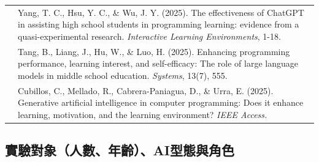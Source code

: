 \begin{longtable}{@{}p{} p{}@{}}
\cite{yang2025chatgpt} & Yang, T. C., Hsu, Y. C., \& Wu, J. Y. (2025). The effectiveness of ChatGPT in assisting high school students in programming learning: evidence from a quasi-experimental research. \textit{Interactive Learning Environments}, 1-18. \\
\cite{tang2025enhancing} & Tang, B., Liang, J., Hu, W., \& Luo, H. (2025). Enhancing programming performance, learning interest, and self-efficacy: The role of large language models in middle school education. \textit{Systems}, 13(7), 555. \\
\cite{cubillos2025generative} & Cubillos, C., Mellado, R., Cabrera-Paniagua, D., \& Urra, E. (2025). Generative artificial intelligence in computer programming: Does it enhance learning, motivation, and the learning environment? \textit{IEEE Access.} \\
\end{longtable}
\endgroup

\subsection{實驗對象（人數、年齡）、AI型態與角色}\label{sec:實驗對象}

